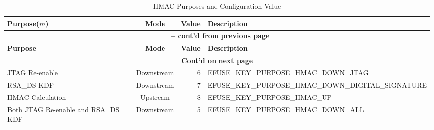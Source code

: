 \begin{longtable}[c]{|p{3.5cm}|c|r|p{9.5cm}|}
\caption{HMAC Purposes and Configuration Value}
\label{tab:hmac-key-purpose}
\\    \hline
    \rowcolor{lightgray}
    \textbf{Purpose(\begin{math}m\end{math})} & \textbf{Mode} & \textbf{Value} & \textbf{Description}\\
    \hline
    \endfirsthead
    \multicolumn{4}{c}{\bfseries \tablename\ \thetable{} -- cont'd from previous page}\\\hline
    
    \rowcolor{lightgray}
    \textbf{Purpose} & \textbf{Mode} & \textbf{Value} & \textbf{Description}\\
    \hline
    \endhead
    \multicolumn{4}{c}{\textbf{Cont'd on next page}}\\
    \endfoot
    \endlastfoot

    \hline
    JTAG Re-enable & Downstream & 6 & EFUSE\_KEY\_PURPOSE\_HMAC\_DOWN\_JTAG \\
    \hline
    RSA\_DS KDF & Downstream & 7 & EFUSE\_KEY\_PURPOSE\_HMAC\_DOWN\_DIGITAL\_SIGNATURE \\
    \hline
    HMAC Calculation  & Upstream & 8 & EFUSE\_KEY\_PURPOSE\_HMAC\_UP \\    
    \hline
    Both JTAG Re-enable and RSA\_DS KDF & Downstream & 5 & EFUSE\_KEY\_PURPOSE\_HMAC\_DOWN\_ALL \\
    \hline
\end{longtable}

